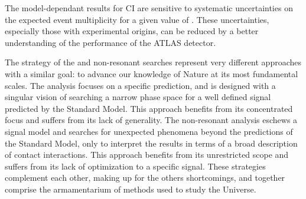 The model-dependant results for CI are sensitive to systematic uncertainties on the expected event multiplicity for a given value of \lam.
These uncertainties, especially those with experimental origins, can be reduced by a better understanding of the performance of the ATLAS detector.


 \threestars


The strategy of the \hmm and non-resonant searches represent very different approaches with a similar goal: to advance our knowledge of Nature at its most fundamental scales.
The \hmm analysis focuses on a specific prediction, and is designed with a singular vision of searching a narrow phase space for a well defined signal predicted by the Standard Model.
This approach benefits from its concentrated focus and suffers from its lack of generality.
The non-resonant analysis eschews a signal model and searches for unexpected phenomena beyond the predictions of the Standard Model, only to interpret the results in terms of a broad description of contact interactions.
This approach benefits from its unrestricted scope and suffers from its lack of optimization to a specific signal.
These strategies complement each other, making up for the others shortcomings, and together comprise the armamentarium of methods used to study the Universe.
